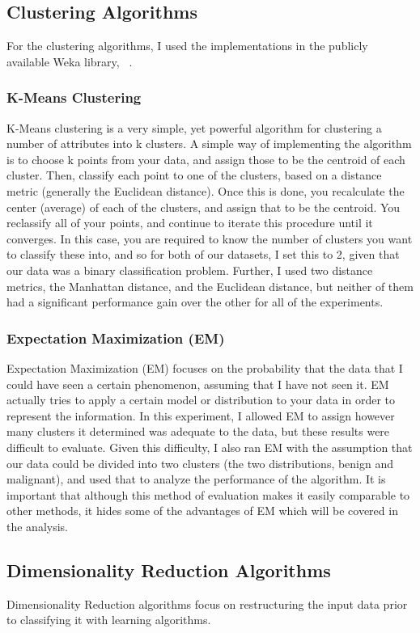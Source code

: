 \documentclass[annual]{acmsiggraph}
\begin{document}
\subsection{Clustering Algorithms}
For the clustering algorithms, I used the implementations in the publicly available Weka library, ~\cite{Hall_weka:2010}.
\subsubsection{K-Means Clustering}
K-Means clustering is a very simple, yet powerful algorithm for clustering a number of attributes into k clusters. A simple way of implementing the algorithm is to choose k points from your data, and assign those to be the centroid of each cluster. Then, classify each point to one of the clusters, based on a distance metric (generally the Euclidean distance). Once this is done, you recalculate the center (average) of each of the clusters, and assign that to be the centroid. You reclassify all of your points, and continue to iterate this procedure until it converges. In this case, you are required to know the number of clusters you want to classify these into, and so for both of our datasets, I set this to 2, given that our data was a binary classification problem. Further, I used two distance metrics, the Manhattan distance, and the Euclidean distance, but neither of them had a significant performance gain over the other for all of the experiments.
\subsubsection{Expectation Maximization (EM)}
Expectation Maximization (EM) focuses on the probability that the data that I could have seen a certain phenomenon, assuming that I have not seen it. EM actually tries to apply a certain model or distribution to your data in order to represent the information. In this experiment, I allowed EM to assign however many clusters it determined was adequate to the data, but these results were difficult to evaluate. Given this difficulty, I also ran EM with the assumption that our data could be divided into two clusters (the two distributions, benign and malignant), and used that to analyze the performance of the algorithm. It is important that although this method of evaluation makes it easily comparable to other methods, it hides some of the advantages of EM which will be covered in the analysis.
\subsection{Dimensionality Reduction Algorithms}
Dimensionality Reduction algorithms focus on restructuring the input data prior to classifying it with learning algorithms.
\end{document}
